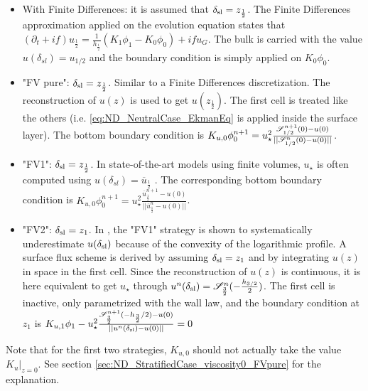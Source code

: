   \begin{itemize}
	  \item With Finite Differences:
		  it is assumed that
		  $\delta_{\rm sl} = z_{\frac{1}{2}}$.
		The Finite Differences approximation applied on
		  the evolution equation states that
		  $(\partial_t+if) u_{\frac{1}{2}}
		  =\frac{1}{h_{\frac{1}{2}}}(K_1\phi_1 - K_0\phi_0)
		  + if u_G$.
		  The bulk is carried with the value
		  $u(\delta_{sl}) = u_{1/2}$ and the boundary
		  condition is simply applied on $K_0\phi_0$.
	  \item "FV pure": $\delta_{\rm sl} = z_{\frac{1}{2}}$. Similar to a Finite Differences discretization.
	    The reconstruction of $u(z)$ is used to get 
		  $u(z_{\frac{1}{2}})$.
		  The first cell is treated like the others
		  (i.e. \eqref{eq:ND_NeutralCase_EkmanEq} is
		  applied inside the surface layer).
	The bottom boundary condition is 
		  $ K_{u,0} \phi_0^{n+1} = u_\star^2 
		  \frac{{\cal S}_{1/2}^{n+1}(0) - u(0)}
		  {||{\cal S}_{1/2}^n(0) - u(0)||}$.
	  \item "FV1": $\delta_{\rm sl} = z_{\frac{1}{2}}$.
		  In state-of-the-art models using finite volumes,
		  $u_{\star}$ is often computed using
		  $u(\delta_{sl}) = \overline{u}_{\frac{1}{2}}$
		\cite{nishizawa_surface_2018}.
		The corresponding bottom boundary condition is
		$ K_{u,0} \phi_0^{n+1} = u_\star^2 
		  \frac{\overline{u}^{n+1}_{\frac{1}{2}}-u(0)}
			{||\overline{u}_{\frac{1}{2}}^n - u(0)||}$.

    \item "FV2":  $\delta_{\rm sl} = z_{1}$. In
    \cite{nishizawa_surface_2018}, the "FV1" strategy is shown to systematically
	  underestimate $u(\delta_{\rm sl})$ because of the 
	  convexity of the logarithmic profile.
	A surface flux scheme is derived by assuming
	  $\delta_{\rm sl} = z_1$ and by integrating $u(z)$
	  in space in the first cell. Since the reconstruction
	  of $u(z)$ is continuous, it is here equivalent to
	  get $u_\star$ through
	  $u^n(\delta_{\rm sl}) = {\cal S}^n_{\frac{3}{2}}(
	  -\frac{h_{3/2}}{2})$. The first cell is inactive, only
	  parametrized with the wall law, and the boundary condition
		  at $z_1$ is $K_{u,1} \phi_1 - u_\star^2 
		  \frac{{\cal S}_{\frac{3}{2}}^{n+1}
			(-h_{\frac{3}{2}}/2)-u(0)}
		  {||u^n(\delta_{\rm sl})-u(0)||} = 0$
	  
  \end{itemize}
  Note that for the first two strategies, $K_{u,0}$
  should not actually
  take the value $\left. K_{u}\right|_{z=0}$.
  See section \ref{sec:ND_StratifiedCase_viscosity0_FVpure} for
  the explanation.

